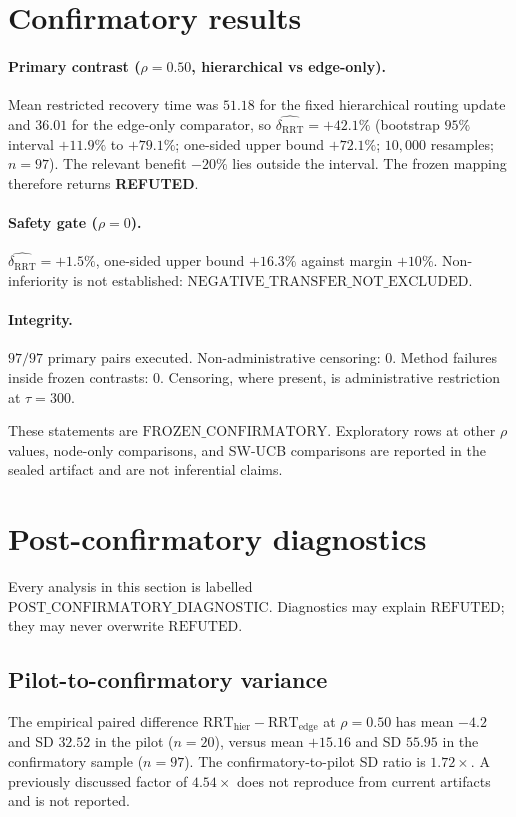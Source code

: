 \documentclass{article}
\newcommand{\rrt}{\mathrm{RRT}}
\newcommand{\deltaRRT}{\delta_{\rrt}}
\begin{document}
\section{Confirmatory results}

\paragraph{Primary contrast ($\rho=0.50$, hierarchical vs edge-only).}
Mean restricted recovery time was $51.18$ for the fixed hierarchical routing update and $36.01$ for the edge-only comparator, so $\widehat{\deltaRRT}=+42.1\%$
(bootstrap $95\%$ interval $+11.9\%$ to $+79.1\%$; one-sided upper bound $+72.1\%$; $10{,}000$ resamples; $n=97$).
The relevant benefit $-20\%$ lies outside the interval.
The frozen mapping therefore returns \textbf{REFUTED}.

\paragraph{Safety gate ($\rho=0$).}
$\widehat{\deltaRRT}=+1.5\%$, one-sided upper bound $+16.3\%$ against margin $+10\%$.
Non-inferiority is not established: $\mathrm{NEGATIVE\_TRANSFER\_NOT\_EXCLUDED}$.

\paragraph{Integrity.}
$97/97$ primary pairs executed.
Non-administrative censoring: $0$.
Method failures inside frozen contrasts: $0$.
Censoring, where present, is administrative restriction at $\tau=300$.

These statements are $\mathrm{FROZEN\_CONFIRMATORY}$.
Exploratory rows at other $\rho$ values, node-only comparisons, and SW-UCB comparisons are reported in the sealed artifact and are not inferential claims.

\section{Post-confirmatory diagnostics}

Every analysis in this section is labelled $\mathrm{POST\_CONFIRMATORY\_DIAGNOSTIC}$.
Diagnostics may explain $\mathrm{REFUTED}$; they may never overwrite $\mathrm{REFUTED}$.

\subsection{Pilot-to-confirmatory variance}
The empirical paired difference $\rrt_{\mathrm{hier}}-\rrt_{\mathrm{edge}}$ at $\rho=0.50$ has mean $-4.2$ and SD $32.52$ in the pilot ($n=20$), versus mean $+15.16$ and SD $55.95$ in the confirmatory sample ($n=97$).
The confirmatory-to-pilot SD ratio is $\mathbf{1.72\times}$.
A previously discussed factor of $4.54\times$ does not reproduce from current artifacts and is not reported.
\end{document}
